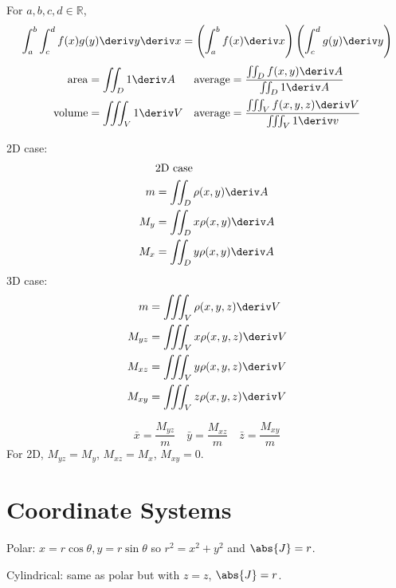 \documentclass[10pt, a4paper]{article}
\begin{document}
\begin{landscape}
\begin{multicols}{3}
    For \(a, b, c, d \in \mathbb{R}\),
    \[
        \int_{a}^{b} \int_{c}^{d} f(x) g(y) \deriv y \deriv x
        = \left(\int_{a}^{b} f(x) \deriv x\right) \left(\int_{c}^{d} g(y) \deriv y\right)
    \]
    \begin{align*}
        \mathrm{area} &= \iint_{D} 1 \deriv A  &
        \mathrm{average} &= \frac{\iint_{D} f(x, y) \deriv A}{\iint_{D} 1 \deriv A} \\
        \mathrm{volume} &= \iiint_{V} 1 \deriv V  &
        \mathrm{average} &= \frac{\iiint_{V} f(x, y, z) \deriv V}{\iiint_{V} 1 \deriv v}
    \end{align*}
    \begin{multicols*}{2}
        2D case:
        \begin{align*}
            &\text{2D case} \\
            m &= \iint_D \rho(x, y) \deriv A \\
            M_y &= \iint_D x \rho(x, y) \deriv A \\
            M_x &= \iint_D y \rho(x, y) \deriv A
        \end{align*}
        \vfill
        \columnbreak
        3D case:
        \begin{align*}
            m &= \iiint_V \rho(x, y, z) \deriv V \\
            M_{yz} &= \iiint_V x \rho(x, y, z) \deriv V \\
            M_{xz} &= \iiint_V y \rho(x, y, z) \deriv V \\
            M_{xy} &= \iiint_V z \rho(x, y, z) \deriv V
        \end{align*}
    \end{multicols*}
    \[\bar x = \frac{M_{yz}}{m} \quad \bar y = \frac{M_{xz}}{m} \quad \bar z = \frac{M_{xy}}{m}\]
    For 2D, \(M_{yz} = M_y\), \(M_{xz} = M_x\), \(M_{xy} = 0\).

    \section{Coordinate Systems}

    Polar: \(x = r \cos \theta, y = r \sin \theta\) so \(r^{2} = x^{2} + y^{2}\) and \(\abs{J} = r\).

    Cylindrical: same as polar but with \(z = z\), \(\abs{J} = r\).


\end{multicols}
\end{landscape}
\end{document}
